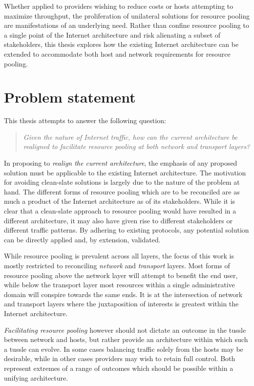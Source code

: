 Whether applied to providers wishing to reduce costs or hosts attempting to maximize throughput, the proliferation of unilateral solutions for resource pooling are manifestations of an underlying need. 
Rather than confine resource pooling to a single point of the Internet architecture and risk alienating a subset of stakeholders, this thesis explores how the existing Internet architecture can be extended to accommodate both host and network requirements for resource pooling.

\section{Problem statement}
\label{sec:introduction:objectives}

This thesis attempts to answer the following question:

\begin{quote}
\textit{
Given the nature of Internet traffic, how can the current architecture be realigned to facilitate resource pooling at both network and transport layers?
}
\end{quote}

In proposing to \emph{realign the current architecture}, the emphasis of any proposed solution must be applicable to the existing Internet architecture.
The motivation for avoiding clean-slate solutions is largely due to the nature of the problem at hand.
The different forms of resource pooling which are to be reconciled are as much a product of the Internet architecture as of its stakeholders.
While it is clear that a clean-slate approach to resource pooling would have resulted in a different architecture, it may also have given rise to different stakeholders or different traffic patterns.
By adhering to existing protocols, any potential solution can be directly applied and, by extension, validated. 

While resource pooling is prevalent across all layers, the focus of this work is mostly restricted to reconciling \emph{network} and \emph{transport} layers. 
Most forms of resource pooling above the network layer will attempt to benefit the end user, while below the transport layer most resources within a single administrative domain will conspire towards the same ends.
It is at the intersection of network and transport layers where the juxtaposition of interests is greatest within the Internet architecture.

\emph{Facilitating resource pooling} however should not dictate an outcome in the tussle between network and hosts, but rather provide an architecture within which such a tussle can evolve.
In some cases balancing traffic solely from the hosts may be desirable, while in other cases providers may wish to retain full control.
Both represent extremes of a range of outcomes which should be possible within a unifying architecture.

